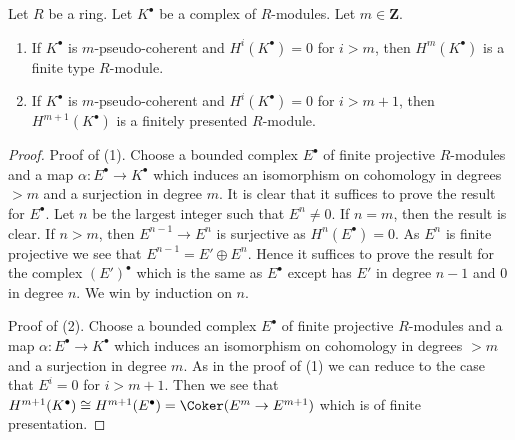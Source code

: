\begin{lemma}
\label{lemma-finite-cohomology}
Let $R$ be a ring. Let $K^\bullet$ be a complex of $R$-modules.
Let $m \in \mathbf{Z}$.
\begin{enumerate}
\item If $K^\bullet$ is $m$-pseudo-coherent and $H^i(K^\bullet) = 0$
for $i > m$, then $H^m(K^\bullet)$ is a finite type $R$-module.
\item If $K^\bullet$ is $m$-pseudo-coherent and $H^i(K^\bullet) = 0$
for $i > m + 1$, then $H^{m + 1}(K^\bullet)$ is a finitely presented
$R$-module.
\end{enumerate}
\end{lemma}

\begin{proof}
Proof of (1). Choose a bounded complex $E^\bullet$ of finite projective
$R$-modules and a map $\alpha : E^\bullet \to K^\bullet$ which induces
an isomorphism on cohomology in degrees $> m$ and a surjection in degree $m$.
It is clear that it suffices to prove the result for $E^\bullet$.
Let $n$ be the largest integer such that $E^n \not = 0$.
If $n = m$, then the result is clear.
If $n > m$, then $E^{n - 1} \to E^n$ is surjective as
$H^n(E^\bullet) = 0$. As $E^n$ is finite projective we see that
$E^{n - 1} = E' \oplus E^n$. Hence it suffices to prove the result
for the complex $(E')^\bullet$ which is the same as $E^\bullet$
except has $E'$ in degree $n - 1$ and $0$ in degree $n$.
We win by induction on $n$.

\medskip\noindent
Proof of (2). Choose a bounded complex $E^\bullet$ of finite projective
$R$-modules and a map $\alpha : E^\bullet \to K^\bullet$ which induces
an isomorphism on cohomology in degrees $> m$ and a surjection in degree $m$.
As in the proof of (1) we can reduce to the case that $E^i = 0$ for
$i > m + 1$. Then we see that
$H^{m + 1}(K^\bullet) \cong
H^{m + 1}(E^\bullet) = \Coker(E^m \to E^{m + 1})$
which is of finite presentation.
\end{proof}
